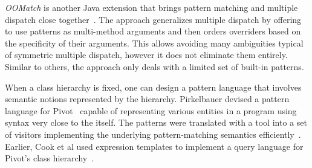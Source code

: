 \emph{OOMatch} is another Java extension that brings pattern matching and multiple 
dispatch close together~\cite{OOMatch07thesis}. The approach generalizes 
multiple dispatch by offering to use patterns as multi-method arguments and then 
orders overriders based on the specificity of their arguments. This allows 
avoiding many ambiguities typical of symmetric multiple dispatch, however it 
does not eliminate them entirely. Similar to others, the approach only deals 
with a limited set of built-in patterns.

When a class hierarchy is fixed, one can design a pattern language that involves 
semantic notions represented by the hierarchy. Pirkelbauer devised a pattern 
language for Pivot~\cite{Pivot09} capable of representing various entities in a 
\Cpp{} program using syntax very close to the \Cpp{} itself. The patterns were 
translated with a tool into a set of visitors implementing the underlying 
pattern-matching semantics efficiently~\cite{PirkelbauerThesis}. Earlier, Cook 
et al used expression templates to implement a query language for Pivot's class 
hierarchy~\cite{iql04}. %
